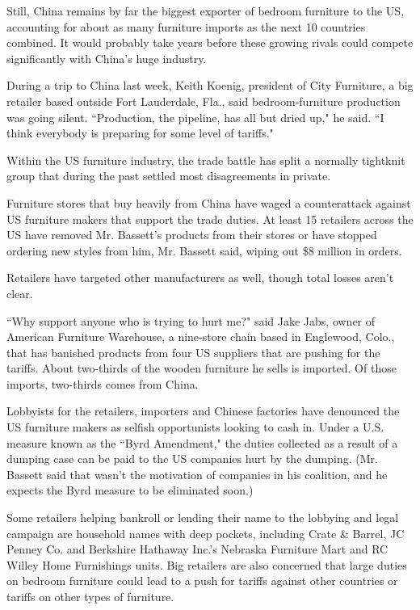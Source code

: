\documentclass[letterpaper,12pt]{article}
\begin{document}
Still, China remains by far the biggest exporter of bedroom furniture to the US, accounting for about as many furniture imports as the next 10 countries combined. It would probably take years before these growing rivals could compete significantly with China's huge industry.

During a trip to China last week, Keith Koenig, president of City Furniture, a big retailer based outside Fort Lauderdale, Fla., said bedroom-furniture production was going silent. ``Production, the pipeline, has all but dried up," he said. ``I think everybody is preparing for some level of tariffs."

Within the US furniture industry, the trade battle has split a normally tightknit group that during the past settled most disagreements in private.

Furniture stores that buy heavily from China have waged a counterattack against US furniture makers that support the trade duties. At least 15 retailers across the US have removed Mr. Bassett's products from their stores or have stopped ordering new styles from him, Mr. Bassett said, wiping out \$8 million in orders.

Retailers have targeted other manufacturers as well, though total losses aren't clear.

``Why support anyone who is trying to hurt me?" said Jake Jabs, owner of American Furniture Warehouse, a nine-store chain based in Englewood, Colo., that has banished products from four US suppliers that are pushing for the tariffs. About two-thirds of the wooden furniture he sells is imported. Of those imports, two-thirds comes from China.

Lobbyists for the retailers, importers and Chinese factories have denounced the US furniture makers as selfish opportunists looking to cash in. Under a U.S. measure known as the ``Byrd Amendment," the duties collected as a result of a dumping case can be paid to the US companies hurt by the dumping. (Mr. Bassett said that wasn't the motivation of companies in his coalition, and he expects the Byrd measure to be eliminated soon.)

Some retailers helping bankroll or lending their name to the lobbying and legal campaign are household names with deep pockets, including Crate \& Barrel, JC Penney Co. and Berkshire Hathaway Inc.'s Nebraska Furniture Mart and RC Willey Home Furnishings units. Big retailers are also concerned that large duties on bedroom furniture could lead to a push for tariffs against other countries or tariffs on other types of furniture.
\end{document}

